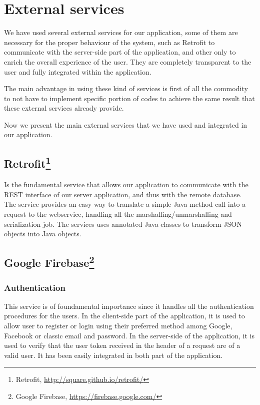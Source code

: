 \documentclass[a4paper]{scrreprt}
\begin{document}
\chapter{External services}
We have used several external services for our application, some of them are necessary for the proper behaviour of the system, such as Retrofit to communicate with the server-side part of the application, and other only to enrich the overall experience of the user. They are completely transparent to the user and fully integrated within the application.
\par The main advantage in using these kind of services is first of all the commodity to not have to implement specific portion of codes to achieve the same result that these external services already provide.
\par Now we present the main external services that we have used and integrated in our application.

\section[Retrofit]{Retrofit\footnote{Retrofit, \url{http://square.github.io/retrofit/}}}
Is the fundamental service that allows our application to communicate with the REST interface of our server application, and thus with the remote database. The service provides an easy way to translate a simple Java method call into a request to the webservice, handling all the marshalling/unmarshalling and serialization job. The services uses annotated Java classes to transform JSON objects into Java objects.

\section[Google Firebase]{Google Firebase\footnote{Google Firebase, \url{https://firebase.google.com/}}}

\subsection{Authentication}
This service is of foundamental importance since it handles all the authentication procedures for the users. In the client-side part of the application, it is used to allow user to register or login using their preferred method among Google, Facebook or classic email and password. In the server-side of the application, it is used to verify that the user token received in the header of a request are of a valid user. It has been easily integrated in both part of the application.
\end{document}
